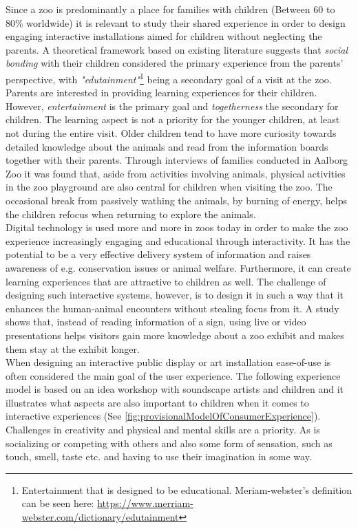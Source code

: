 Since a zoo is predominantly a place for families with children (Between 60 to 80\% worldwide)\cite{togetherAtTheZoo} it is relevant to study their shared experience in order to design engaging interactive installations aimed for children without neglecting the parents.
A theoretical framework based on existing literature suggests that \textit{social bonding} with their children considered the primary experience from the parents' perspective, with \textit{"edutainment"}\footnote{Entertainment that is designed to be educational. Meriam-webster's definition can be seen here: \url{https://www.merriam-webster.com/dictionary/edutainment}} being a secondary goal of a visit at the zoo. Parents are interested in providing learning experiences for their children. However, \textit{entertainment} is the primary goal and \textit{togetherness} the secondary for children\cite{togetherAtTheZoo}. The learning aspect is not a priority for the younger children, at least not during the entire visit. Older children tend to have more curiosity towards detailed knowledge about the animals and read from the information boards together with their parents\cite{togetherAtTheZoo}. Through interviews of families conducted in Aalborg Zoo it was found that, aside from activities involving animals, physical activities in the zoo playground are also central for children when visiting the zoo. The occasional break from passively wathing the animals, by burning of energy, helps the children refocus when returning to explore the animals\cite{togetherAtTheZoo}.\\
Digital technology is used more and more in zoos today in order to make the zoo experience increasingly engaging and educational through interactivity\cite{webberInteractiveTechInZoo}. It has the potential to be a very effective delivery system of information and raises awareness of e.g. conservation issues or animal welfare. Furthermore, it can create learning experiences that are attractive to children as well\cite{webberInteractiveTechInZoo}. The challenge of designing such interactive systems, however, is to design it in such a way that it enhances the human-animal encounters without stealing focus from it\cite{webberInteractiveTechInZoo}. A study shows that, instead of reading information of a sign, using live or video presentations helps visitors gain more knowledge about a zoo exhibit and makes them stay at the exhibit longer\cite{presentationStayDuration}.\\
When designing an interactive public display or art installation ease-of-use is often considered the main goal of the user experience\cite{Hull2018}. The following experience model is based on an idea workshop with soundscape artists and children and it illustrates what aspects are also important to children when it comes to interactive experiences (See \autoref{fig:provisionalModelOfConsumerExperience}). Challenges in creativity and physical and mental skills are a priority. As is socializing or competing with others and also some form of sensation, such as touch, smell, taste etc. and having to use their imagination in some way.
